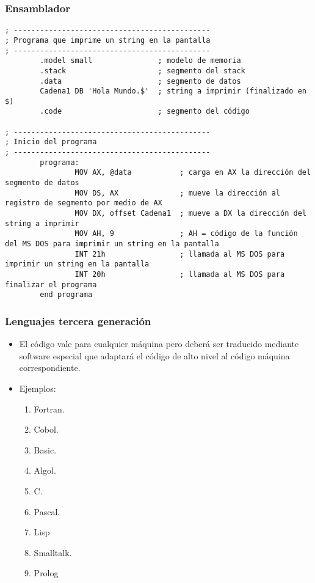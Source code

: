 \documentclass{beamer}
\begin{document}
\begin{frame}[fragile]
\frametitle{Ensamblador} 
\begin{tiny}
\begin{verbatim}
; ---------------------------------------------
; Programa que imprime un string en la pantalla
; ---------------------------------------------
        .model small               ; modelo de memoria
        .stack                     ; segmento del stack
        .data                      ; segmento de datos
        Cadena1 DB 'Hola Mundo.$'  ; string a imprimir (finalizado en $)
        .code                      ; segmento del código
 
; ---------------------------------------------
; Inicio del programa
; ---------------------------------------------
        programa:
                MOV AX, @data           ; carga en AX la dirección del segmento de datos
                MOV DS, AX              ; mueve la dirección al registro de segmento por medio de AX
                MOV DX, offset Cadena1  ; mueve a DX la dirección del string a imprimir
                MOV AH, 9               ; AH = código de la función del MS DOS para imprimir un string en la pantalla
                INT 21h                 ; llamada al MS DOS para imprimir un string en la pantalla
                INT 20h                 ; llamada al MS DOS para finalizar el programa
        end programa
\end{verbatim} 
\end{tiny}
\end{frame}


\begin{frame}
\frametitle{Lenguajes tercera generación}
\begin{itemize}[<+->]
\item El código vale para cualquier máquina pero deberá ser traducido mediante software especial que adaptará el código de alto nivel al código máquina correspondiente.  
\item Ejemplos:
\begin{enumerate}
\item Fortran.
\item Cobol.
\item Basic.
\item Algol.
\item C.
\item Pascal.
\item Lisp
\item Smalltalk.
\item Prolog
\end{enumerate}
\end{itemize}
\end{frame}
\end{document}
